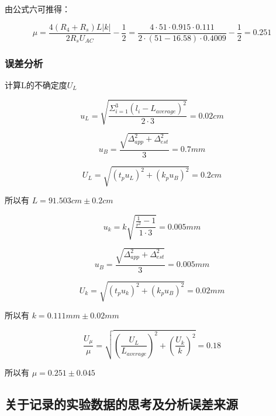 \documentclass[a4paper,UTF8]{ctexart}
\begin{document}
由公式六可推得：

\begin{equation}
    \mu = \frac{4(R_4+R_s)L|k|}{2 R_s U_{AC}} - \frac{1}{2} = \frac{4 \cdot 51 \cdot 0.915 \cdot 0.111}{2 \cdot (51 - 16.58) \cdot 0.4009} - \frac{1}{2} = 0.251
\end{equation}

\subsubsection{误差分析}

计算L的不确定度$U_L$

\begin{equation}
    u_L = \sqrt{\frac{\Sigma^3_{i=1} (l_i-L_{average})^2}{2 \cdot 3}} = 0.02 cm
\end{equation}

\begin{equation}
    u_B = \frac{\sqrt{\Delta^2_{app}+\Delta^2_{est}}}{3} = 0.7 mm
\end{equation}

\begin{equation}
    U_L = \sqrt{(t_p u_L)^2+(k_p u_B)^2} = 0.2 cm
\end{equation}

所以有 $ L = 91.503cm \pm 0.2cm$

\begin{equation}
    u_k = k\sqrt{\frac{\frac{1}{r^2}-1}{1\cdot3}} = 0.005 mm
\end{equation}

\begin{equation}
    u_B = \frac{\sqrt{\Delta^2_{app}+\Delta^2_{est}}}{3} = 0.005 mm
\end{equation}

\begin{equation}
    U_k = \sqrt{(t_p u_k)^2+(k_p u_B)^2} = 0.02 mm
\end{equation}

所以有 $k = 0.111mm \pm 0.02mm$

\begin{equation}
    \frac{U_{\mu}}{\mu} = \sqrt{(\frac{U_L}{L_{average}})^2+(\frac{U_k}{k})^2} = 0.18
\end{equation}

所以有 $\mu = 0.251 \pm 0.045$

\subsection{关于记录的实验数据的思考及分析误差来源}
\end{document}
